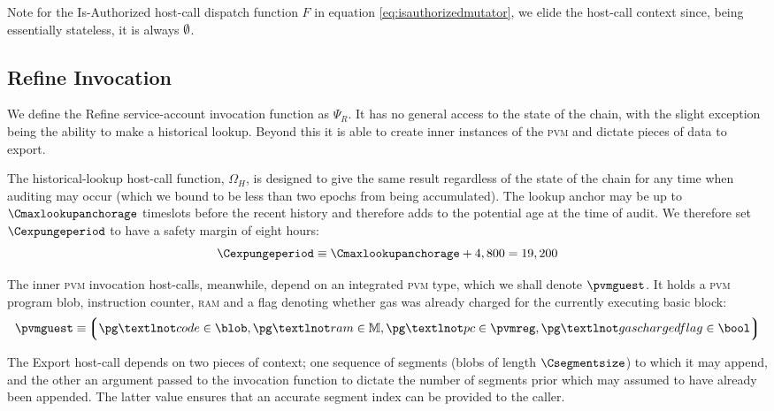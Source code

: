 Note for the Is-Authorized host-call dispatch function $F$ in equation \ref{eq:isauthorizedmutator}, we elide the host-call context since, being essentially stateless, it is always $\emptyset$.

\subsection{Refine Invocation}\label{sec:refineinvocation}

We define the Refine service-account invocation function as $\Psi_R$. It has no general access to the state of the \Jam chain, with the slight exception being the ability to make a historical lookup. Beyond this it is able to create inner instances of the \textsc{pvm} and dictate pieces of data to export.

The historical-lookup host-call function, $\Omega_H$, is designed to give the same result regardless of the state of the chain for any time when auditing may occur (which we bound to be less than two epochs from being accumulated). The lookup anchor may be up to $\Cmaxlookupanchorage$ timeslots before the recent history and therefore adds to the potential age at the time of audit. We therefore set $\Cexpungeperiod$ to have a safety margin of eight hours:
\begin{equation}
  \Cexpungeperiod \equiv \Cmaxlookupanchorage + 4,800 = 19,200
\end{equation}


The inner \textsc{pvm} invocation host-calls, meanwhile, depend on an integrated \textsc{pvm} type, which we shall denote $\pvmguest$. It holds a \textsc{pvm} program blob, instruction counter, \textsc{ram} and a flag denoting whether gas was already charged for the currently executing basic block:
\begin{equation}\label{eq:pvmguest}
  \pvmguest \equiv \tuple{\isa{\pg¬code}{\blob}, \isa{\pg¬ram}{\ram}, \isa{\pg¬pc}{\pvmreg}, \isa{\pg¬gaschargedflag}{\bool}}
\end{equation}

The Export host-call depends on two pieces of context; one sequence of segments (blobs of length $\Csegmentsize$) to which it may append, and the other an argument passed to the invocation function to dictate the number of segments prior which may assumed to have already been appended. The latter value ensures that an accurate segment index can be provided to the caller.

